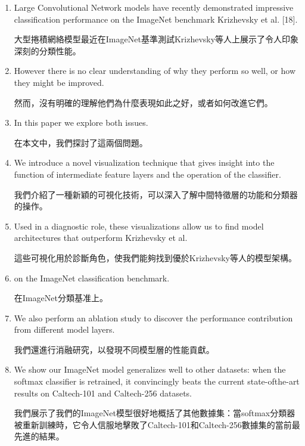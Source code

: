 \begin{enumerate}

\item Large Convolutional Network models have recently demonstrated impressive classification performance on the ImageNet benchmark Krizhevsky et al. [18]. 

大型捲積網絡模型最近在ImageNet基準測試Krizhevsky等人上展示了令人印象深刻的分類性能。

\item However there is no clear understanding of why they perform so well, or how they might be improved. 

然而，沒有明確的理解他們為什麼表現如此之好，或者如何改進它們。

\item In this paper we explore both issues. 

在本文中，我們探討了這兩個問題。

\item We introduce a novel visualization technique that gives insight into the function of intermediate feature layers and the operation of the classifier. 

我們介紹了一種新穎的可視化技術，可以深入了解中間特徵層的功能和分類器的操作。

\item Used in a diagnostic role, these visualizations allow us to find model architectures that outperform Krizhevsky et al. 

這些可視化用於診斷角色，使我們能夠找到優於Krizhevsky等人的模型架構。

\item on the ImageNet classification benchmark. 

在ImageNet分類基准上。

\item We also perform an ablation study to discover the performance contribution from different model layers. 

我們還進行消融研究，以發現不同模型層的性能貢獻。

\item We show our ImageNet model generalizes well to other datasets: when the softmax classifier is retrained, it convincingly beats the current state-ofthe-art results on Caltech-101 and Caltech-256 datasets.

我們展示了我們的ImageNet模型很好地概括了其他數據集：當softmax分類器被重新訓練時，它令人信服地擊敗了Caltech-101和Caltech-256數據集的當前最先進的結果。

\end{enumerate}

